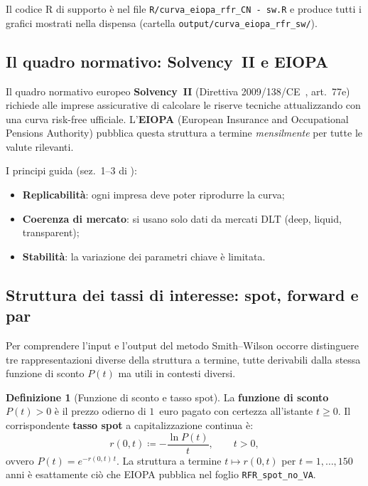 \documentclass[11pt,a4paper]{article}
\theoremstyle{plain}
\theoremstyle{definition}
\newtheorem{definizione}[teorema]{Definizione}
\theoremstyle{remark}
\newcommand{\defeq}{\coloneqq}
\begin{document}
Il codice R di supporto \`e nel file \texttt{R/curva\_eiopa\_rfr\_CN\ -\ sw.R} e produce
tutti i grafici mostrati nella dispensa (cartella \texttt{output/curva\_eiopa\_rfr\_sw/}).

\subsection{Il quadro normativo: Solvency~II e EIOPA}

Il quadro normativo europeo \textbf{Solvency~II} (Direttiva 2009/138/CE~\cite{dir2009},
art.~77e) richiede alle imprese assicurative di calcolare le riserve tecniche
attualizzando con una curva risk-free ufficiale. L'\textbf{EIOPA}
(European Insurance and Occupational Pensions Authority) pubblica questa struttura
a termine \emph{mensilmente} per tutte le valute rilevanti.

I principi guida (sez.~1--3 di \cite{eiopa2025}):
\begin{itemize}
  \item \textbf{Replicabilit\`a}: ogni impresa deve poter riprodurre la curva;
  \item \textbf{Coerenza di mercato}: si usano solo dati da mercati DLT
        (deep, liquid, transparent);
  \item \textbf{Stabilit\`a}: la variazione dei parametri chiave \`e limitata.
\end{itemize}

\subsection{Struttura dei tassi di interesse: spot, forward e par}
\label{sec:tassi-def}

Per comprendere l'input e l'output del metodo Smith--Wilson occorre distinguere
tre rappresentazioni diverse della struttura a termine, tutte derivabili dalla
stessa funzione di sconto $P(t)$ ma utili in contesti diversi.

\begin{definizione}[Funzione di sconto e tasso spot]
La \textbf{funzione di sconto} $P(t)>0$ \`e il prezzo odierno di $1$~euro
pagato con certezza all'istante $t \ge 0$.
Il corrispondente \textbf{tasso spot} a capitalizzazione continua \`e:
\[
  r(0,t) \defeq -\frac{\ln P(t)}{t}, \qquad t > 0,
\]
ovvero $P(t) = e^{-r(0,t)\,t}$.
La struttura a termine $t \mapsto r(0,t)$ per $t=1,\ldots,150$ anni \`e
esattamente ci\`o che EIOPA pubblica nel foglio \texttt{RFR\_spot\_no\_VA}.
\end{definizione}
\end{document}
